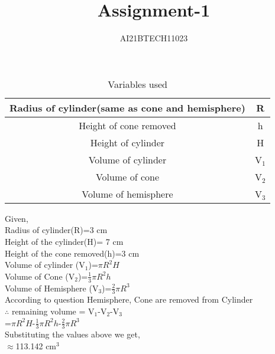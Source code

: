 \documentclass[12pt]{article}
\begin{document}
\title{Assignment-1}
\author{AI21BTECH11023}
\maketitle
\begin{table}
\caption{Variables used}
\begin{tabular}{c c}
\hline
Radius of cylinder(same as cone and hemisphere) & R\\
\hline
Height of cone removed & h\\
\hline
Height of cylinder & H\\
\hline
Volume of cylinder & V\(_1\)\\
\hline
Volume of cone  & V\(_2\)\\
\hline
Volume of hemisphere & V\(_3\)\\
\hline
\end{tabular}
\end{table}
Given,\\
Radius of cylinder(R)=3 cm\\
Height of the cylinder(H)= 7 cm\\
Height of the cone removed(h)=3 cm\\
Volume of cylinder (V\(_1\))=\(\pi R^2 H\)\\
Volume of Cone (V\(_2\))=\(\frac{1}{3} \pi R^2 h\)\\
Volume of Hemisphere (V\(_3\))=\(\frac{2}{3} \pi R^3\)\\
According to question Hemisphere, Cone are removed from Cylinder\\
\(\therefore\) remaining volume = V\(_1\)-V\(_2\)-V\(_3\)\\
=\(\pi R^2 H\)-\(\frac{1}{3} \pi R^2 h\)-\(\frac{2}{3} \pi R^3\)\\
Substituting the values above we get,\\
\(\approx\)113.142 cm\(^3\)
\end{document}
